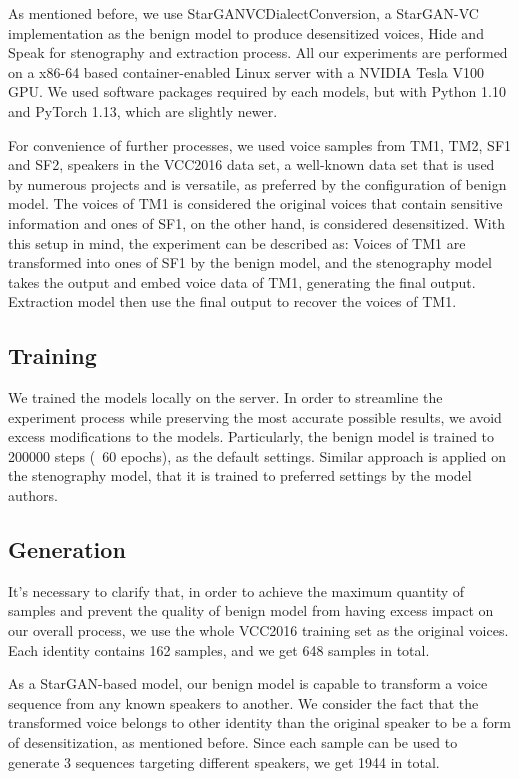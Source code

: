 \documentclass[journal]{IEEEtran} %
\begin{document}
\begin{CJK*}{UTF8}{gbsn}
As mentioned before, we use StarGANVCDialectConversion, a StarGAN-VC implementation as the benign model to produce desensitized voices, Hide and Speak for stenography and extraction process. All our experiments are performed on a x86-64 based container-enabled Linux server with a NVIDIA Tesla V100 GPU. We used software packages required by each models, but with Python 1.10 and PyTorch 1.13, which are slightly newer.

 For convenience of further processes, we used voice samples from TM1, TM2, SF1 and SF2, speakers in the VCC2016 data set\cite{a16}, a well-known data set that is used by numerous projects and is versatile\cite{a17, a18}, as preferred by the configuration of benign model. The voices of TM1 is considered the original voices that contain sensitive information and ones of SF1, on the other hand, is considered desensitized. With this setup in mind, the experiment can be described as: Voices of TM1 are transformed into ones of SF1 by the benign model, and the stenography model takes the output and embed voice data of TM1, generating the final output. Extraction model then use the final output to recover the voices of TM1.

\subsection{Training}

We trained the models locally on the server. In order to streamline the experiment process while preserving the most accurate possible results, we avoid excess modifications to the models. Particularly, the benign model is trained to 200000 steps (~60 epochs), as the default settings. Similar approach is applied on the stenography model, that it is trained to preferred settings by the model authors.

\subsection{Generation}

It's necessary to clarify that, in order to achieve the maximum quantity of samples and prevent the quality of benign model from having excess impact on our overall process, we use the whole VCC2016 training set as the original voices. Each identity contains 162 samples, and we get 648 samples in total.

As a StarGAN-based model, our benign model is capable to transform a voice sequence from any known speakers to another. We consider the fact that the transformed voice belongs to other identity than the original speaker to be a form of desensitization, as mentioned before. Since each sample can be used to generate 3 sequences targeting different speakers, we get 1944 in total.


\end{CJK*}
\end{document}
